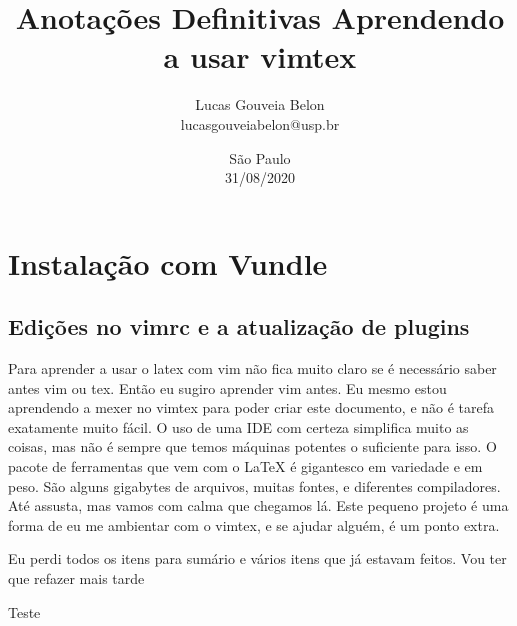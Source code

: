 \documentclass[a4paper, 12pt]{article}
\begin{document}
\title{
    \textbf{
    Anotações Definitivas
    }
    \break
    Aprendendo a usar vimtex
}
\author{
    Lucas Gouveia Belon
    \\
    lucasgouveiabelon@usp.br
}

\date{\vspace{2.2cm}São Paulo\\31/08/2020}

\maketitle
\newpage
\tableofcontents
\newpage
\section{Instalação com Vundle}
\subsection{Edições no vimrc e a atualização de plugins}

Para aprender a usar o latex com vim não fica muito claro se é necessário saber antes vim ou tex. Então eu sugiro aprender vim antes. Eu mesmo estou aprendendo a mexer no vimtex para poder criar este documento, e não é tarefa exatamente muito fácil. O uso de uma IDE com certeza simplifica muito as coisas, mas não é sempre que temos máquinas potentes o suficiente para isso. O pacote de ferramentas que vem com o \LaTeX \hspace{0.5cm} é gigantesco em variedade e em peso. São alguns gigabytes de arquivos, muitas fontes, e diferentes compiladores. Até assusta, mas vamos com calma que chegamos lá. Este pequeno projeto é uma forma de eu me ambientar com o vimtex, e se ajudar alguém, é um ponto extra.

Eu perdi todos os itens para sumário e vários itens que já estavam feitos.
Vou ter que refazer mais tarde


Teste
\end{document}
